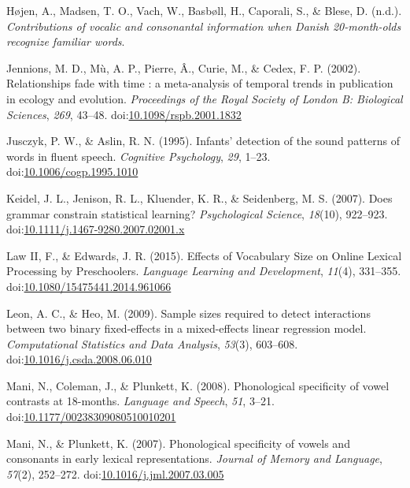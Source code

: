 \documentclass[man]{apa6}
\begin{document}
\leavevmode\hypertarget{ref-Hojen}{}%
Højen, A., Madsen, T. O., Vach, W., Basbøll, H., Caporali, S., \& Blese, D. (n.d.). \emph{Contributions of vocalic and consonantal information when Danish 20-month-olds recognize familiar words}.

\leavevmode\hypertarget{ref-Jennions2002}{}%
Jennions, M. D., Mù, A. P., Pierre, Â., Curie, M., \& Cedex, F. P. (2002). Relationships fade with time : a meta-analysis of temporal trends in publication in ecology and evolution. \emph{Proceedings of the Royal Society of London B: Biological Sciences}, \emph{269}, 43--48. doi:\href{https://doi.org/10.1098/rspb.2001.1832}{10.1098/rspb.2001.1832}

\leavevmode\hypertarget{ref-Jusczyk1995}{}%
Jusczyk, P. W., \& Aslin, R. N. (1995). Infants' detection of the sound patterns of words in fluent speech. \emph{Cognitive Psychology}, \emph{29}, 1--23. doi:\href{https://doi.org/10.1006/cogp.1995.1010}{10.1006/cogp.1995.1010}

\leavevmode\hypertarget{ref-Keidel2007}{}%
Keidel, J. L., Jenison, R. L., Kluender, K. R., \& Seidenberg, M. S. (2007). Does grammar constrain statistical learning? \emph{Psychological Science}, \emph{18}(10), 922--923. doi:\href{https://doi.org/10.1111/j.1467-9280.2007.02001.x}{10.1111/j.1467-9280.2007.02001.x}

\leavevmode\hypertarget{ref-Law2015}{}%
Law II, F., \& Edwards, J. R. (2015). Effects of Vocabulary Size on Online Lexical Processing by Preschoolers. \emph{Language Learning and Development}, \emph{11}(4), 331--355. doi:\href{https://doi.org/10.1080/15475441.2014.961066}{10.1080/15475441.2014.961066}

\leavevmode\hypertarget{ref-Leon2009}{}%
Leon, A. C., \& Heo, M. (2009). Sample sizes required to detect interactions between two binary fixed-effects in a mixed-effects linear regression model. \emph{Computational Statistics and Data Analysis}, \emph{53}(3), 603--608. doi:\href{https://doi.org/10.1016/j.csda.2008.06.010}{10.1016/j.csda.2008.06.010}

\leavevmode\hypertarget{ref-Mani2008}{}%
Mani, N., Coleman, J., \& Plunkett, K. (2008). Phonological specificity of vowel contrasts at 18-months. \emph{Language and Speech}, \emph{51}, 3--21. doi:\href{https://doi.org/10.1177/00238309080510010201}{10.1177/00238309080510010201}

\leavevmode\hypertarget{ref-Mani2007}{}%
Mani, N., \& Plunkett, K. (2007). Phonological specificity of vowels and consonants in early lexical representations. \emph{Journal of Memory and Language}, \emph{57}(2), 252--272. doi:\href{https://doi.org/10.1016/j.jml.2007.03.005}{10.1016/j.jml.2007.03.005}
\end{document}
